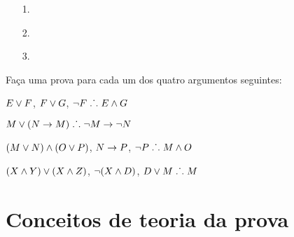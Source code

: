 \begin{itemize}
\item[1.] 
	\begin{fitchproof}
 {}
 {}
\end{fitchproof}

\item[]

\item[2.]
\begin{fitchproof}
\open
\close
{}
\end{fitchproof}

\item[]

\item[3.]
\begin{fitchproof}
\open
	 {}
		\open
	\close
\close
{}
\end{fitchproof}
\end{itemize}

\problempart 
Faça uma prova para cada um dos quatro argumentos seguintes:
\begin{earg}
\item $E\vee F$, $F\vee G$, $\neg F \mathrel{\ldotp\dot{}\,\ldotp} E \wedge G$
\item $M\vee(N\rightarrow M) \mathrel{\ldotp\dot{}\,\ldotp} \neg M \rightarrow \neg N$
\item $(M \vee N) \wedge (O \vee P)$, $N \rightarrow P$, $\neg P \mathrel{\ldotp\dot{}\,\ldotp} M\wedge O$
\item $(X\wedge Y)\vee(X\wedge Z)$, $\neg(X\wedge D)$, $D\vee M \mathrel{\ldotp\dot{}\,\ldotp} M$
\end{earg}


\chapter{Conceitos de teoria da prova}\label{s:ProofTheoreticConcepts}

